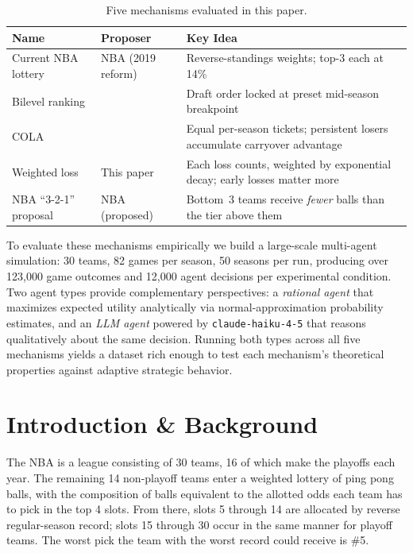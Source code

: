 \documentclass{article}
\begin{document}
\begin{table}[h]
\centering
\renewcommand{\arraystretch}{1.3}
\begin{tabular}{p{3.2cm} p{4.2cm} p{5.0cm}}
\toprule
\textbf{Name} & \textbf{Proposer} & \textbf{Key Idea} \\
\midrule
Current NBA lottery &
NBA (2019 reform) &
Reverse-standings weights; top-3 each at 14\% \\
Bilevel ranking &
\citet{kazachkov2020} &
Draft order locked at preset mid-season breakpoint \\
COLA &
\citet{highley2026} &
Equal per-season tickets; persistent losers accumulate carryover advantage \\
Weighted loss &
This paper &
Each loss counts, weighted by exponential decay; early losses matter more \\
NBA ``3-2-1'' proposal &
NBA (proposed) &
Bottom~3 teams receive \emph{fewer} balls than the tier above them \\
\bottomrule
\end{tabular}
\caption{Five mechanisms evaluated in this paper.}
\label{tab:overview}
\end{table}

To evaluate these mechanisms empirically we build a large-scale multi-agent
simulation: 30 teams, 82 games per season, 50 seasons per run, producing
over 123{,}000 game outcomes and 12{,}000 agent decisions per experimental
condition.
Two agent types provide complementary perspectives: a \emph{rational agent}
that maximizes expected utility analytically via normal-approximation
probability estimates, and an \emph{LLM agent} powered by
\texttt{claude-haiku-4-5} that reasons qualitatively about the same
decision.
Running both types across all five mechanisms yields a dataset rich enough
to test each mechanism's theoretical properties against adaptive strategic
behavior.


\section{Introduction \& Background}

The NBA is a league consisting of 30 teams, 16 of which make the playoffs each
year.
The remaining 14 non-playoff teams enter a weighted lottery of ping pong balls,
with the composition of balls equivalent to the allotted odds each team has to
pick in the top 4 slots.
From there, slots 5 through 14 are allocated by reverse regular-season record;
slots 15 through 30 occur in the same manner for playoff teams.
The worst pick the team with the worst record could receive is \#5.
\end{document}
